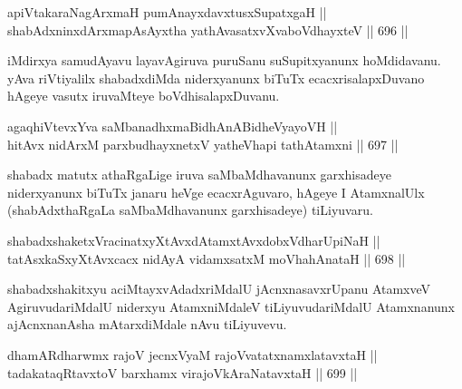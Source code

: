 
\begin{shl}
apiVtakaraNagArxmaH pumAnayxdavxtusxSupatxgaH || \\
shabAdxninxdArxmapAsAyxtha yathAvasatxvXvaboVdhayxteV \hfill || 696 ||  
\end{shl}

\begin{artha} 
iMdirxya samudAyavu layavAgiruva puruSanu suSupitxyanunx hoMdidavanu. 
yAva riVtiyalilx shabadxdiMda niderxyanunx biTuTx ecacxrisalapxDuvano 
hAgeye vasutx iruvaMteye boVdhisalapxDuvanu.
\end{artha}


\begin{shl}
agaqhiVtevxYva saMbanadhxmaBidhAnABidheVyayoVH || \\
hitAvx nidArxM parxbudhayxnetxV yatheVhapi tathA\s \s tamxni \hfill || 697 || 
\end{shl}

\begin{artha} 
shabadx matutx athaRgaLige iruva saMbaMdhavanunx garxhisadeye 
niderxyanunx biTuTx janaru heVge ecacxrAguvaro, hAgeye I AtamxnalUlx 
(shabAdxthaRgaLa saMbaMdhavanunx garxhisadeye) tiLiyuvaru.
\end{artha}

\begin{shl}
shabadxshaketxVracinatxyXtAvxdAtamxtAvxdobxVdharUpiNaH || \\
tatAsxkaSxyXtAvxcacx nidAyA vidamxsatxM moVhahAnataH \hfill || 698 ||  
\end{shl}

\begin{artha} 
shabadxshakitxyu aciMtayxvAdadxriMdalU jAcnxnasavxrUpanu AtamxveV 
AgiruvudariMdalU niderxyu AtamxniMdaleV tiLiyuvudariMdalU 
Atamxnanunx ajAcnxnanAsha mAtarxdiMdale nAvu tiLiyuvevu.
\end{artha}


\begin{shl}
dhamARdharwmx rajoV jecnxVyaM rajoVvatatxnamxlatavxtaH || \\
tadakataqRtavxtoV barxhamx virajoV\s kAraNatavxtaH \hfill || 699 ||  
\end{shl}


